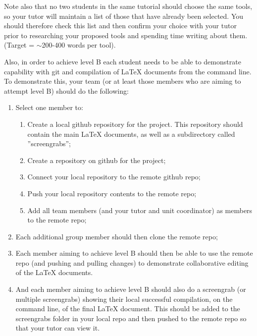 \documentclass[a4paper, 11pt]{report}
\begin{document}
Note also that no two students in the same tutorial should choose the same tools, so your tutor will maintain a list of those that have already been selected. You should therefore check this list and then confirm your choice with your tutor prior to researching your proposed tools and spending time writing about them. (Target = $\sim$200-400 words per tool).
	
Also, in order to achieve level B each student needs to be able to demonstrate capability with git and compilation of LaTeX documents from the command line. To demonstrate this, your team (or at least those members who are aiming to attempt level B) should do the following:
\begin{enumerate}
	\item Select one member to:
	\begin{enumerate}
		\item Create a local github repository for the project. This repository should contain the main LaTeX documents, as well as a subdirectory called ''screengrabs'';
		\item Create a repository on github for the project;
		\item Connect your local repository to the remote github repo;
		\item Push your local repository contents to the remote repo;
		\item Add all team members (and your tutor and unit coordinator) as members to the remote repo;
	\end{enumerate}
		\item Each additional group member should then clone the remote repo;
		\item Each member aiming to achieve level B should then be able to use the remote repo (and pushing and pulling changes) to demonstrate collaborative editing of the LaTeX documents.
		\item And each member aiming to achieve level B should also do a screengrab (or multiple screengrabs) showing their local successful compilation, on the command line, of the final LaTeX document. This should be added to the screengrabs folder in your local repo and then pushed to the remote repo so that your tutor can view it.
\end{enumerate}
\end{document}
